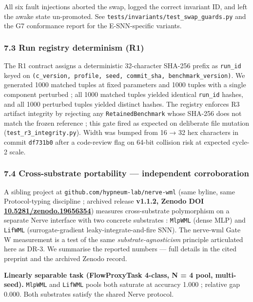 \documentclass[
]{article}
\begin{document}
All six fault injections aborted the swap, logged the correct invariant
ID, and left the awake state un-promoted. See
\texttt{tests/invariants/test\_swap\_guards.py} and the G7 conformance
report for the E-SNN-specific variants.

\subsubsection{7.3 Run registry determinism
(R1)}\label{run-registry-determinism-r1}

The R1 contract assigns a deterministic 32-character SHA-256 prefix as
\texttt{run\_id} keyed on
\texttt{(c\_version,\ profile,\ seed,\ commit\_sha,\ benchmark\_version)}.
We generated 1000 matched tuples at fixed parameters and 1000 tuples
with a single component perturbed ; all 1000 matched tuples yielded
identical \texttt{run\_id} hashes, and all 1000 perturbed tuples yielded
distinct hashes. The registry enforces R3 artifact integrity by
rejecting any \texttt{RetainedBenchmark} whose SHA-256 does not match
the frozen reference ; this gate fired as expected on deliberate file
mutation (\texttt{test\_r3\_integrity.py}). Width was bumped from 16 →
32 hex characters in commit \texttt{df731b0} after a code-review flag on
64-bit collision risk at expected cycle-2 scale.

\subsubsection{7.4 Cross-substrate portability --- independent
corroboration}\label{cross-substrate-portability-independent-corroboration}

A sibling project at \texttt{github.com/hypneum-lab/nerve-wml} (same
byline, same Protocol-typing discipline ; archived release
\textbf{v1.1.2, Zenodo DOI
\href{https://doi.org/10.5281/zenodo.19656354}{10.5281/zenodo.19656354}})
measures cross-substrate polymorphism on a separate Nerve interface with
two concrete substrates : \texttt{MlpWML} (dense MLP) and
\texttt{LifWML} (surrogate-gradient leaky-integrate-and-fire SNN). The
nerve-wml Gate W measurement is a test of the same
\emph{substrate-agnosticism} principle articulated here as DR-3. We
summarise the reported numbers --- full details in the cited preprint
and the archived Zenodo record.

\textbf{Linearly separable task (FlowProxyTask 4-class, N = 4 pool,
multi-seed).} \texttt{MlpWML} and \texttt{LifWML} pools both saturate at
accuracy 1.000 ; relative gap 0.000. Both substrates satisfy the shared
Nerve protocol.
\end{document}
